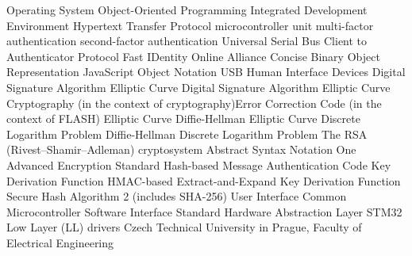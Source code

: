       {Operating System}
     {Object-Oriented Programming}
     {Integrated Development Environment}
    {Hypertext Transfer Protocol}
     {microcontroller unit}
     {multi-factor authentication}
     {second-factor authentication}
     {Universal Serial Bus}
    {Client to Authenticator Protocol}
    {Fast IDentity Online Alliance}
    {Concise Binary Object Representation}
    {JavaScript Object Notation}
     {USB Human Interface Devices}
     {Digital Signature Algorithm}
   {Elliptic Curve Digital Signature Algorithm}
     {Elliptic Curve Cryptography (in the context of cryptography){\nl}Error Correction Code (in the context of FLASH)}
    {Elliptic Curve Diffie-Hellman}
   {Elliptic Curve Discrete Logarithm Problem}
      {Diffie-Hellman}
     {Discrete Logarithm Problem}
     {The RSA (Rivest–Shamir–Adleman) cryptosystem}
   {Abstract Syntax Notation One}
     {Advanced Encryption Standard}
    {Hash-based Message Authentication Code}
     {Key Derivation Function}
    {HMAC-based Extract-and-Expand Key Derivation Function}
   {Secure Hash Algorithm 2 (includes SHA-256)}
      {User Interface}
   {Common Microcontroller Software Interface Standard}
     {Hardware Abstraction Layer}
      {STM32 Low Layer (LL) drivers}
 {Czech Technical University in Prague, Faculty of Electrical Engineering}
